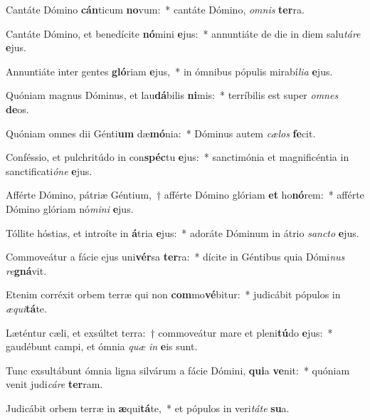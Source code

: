 \item Cantáte Dómino \textbf{cán}ticum \textbf{no}vum:~* cantáte Dómino, \textit{om}\textit{nis} \textbf{ter}ra.
\item Cantáte Dómino, et benedícite \textbf{nó}mini \textbf{e}jus:~* annuntiáte de die in diem salu\textit{tá}\textit{re} \textbf{e}jus.
\item Annuntiáte inter gentes \textbf{gló}riam \textbf{e}jus,~* in ómnibus pópulis mirabí\textit{li}\textit{a} \textbf{e}jus.
\item Quóniam magnus Dóminus, et lau\textbf{dá}bilis \textbf{ni}mis:~* terríbilis est super \textit{om}\textit{nes} \textbf{de}os.
\item Quóniam omnes dii Génti\textbf{um} dæ\textbf{mó}nia:~* Dóminus autem \textit{cæ}\textit{los} \textbf{fe}cit.
\item Conféssio, et pulchritúdo in con\textbf{spéc}tu \textbf{e}jus:~* sanctimónia et magnificéntia in sanctificati\textit{ó}\textit{ne} \textbf{e}jus.
\item Afférte Dómino, pátriæ Géntium,~† afférte Dómino glóriam \textbf{et} ho\textbf{nó}rem:~* afférte Dómino glóriam nó\textit{mi}\textit{ni} \textbf{e}jus.
\item Tóllite hóstias, et introíte in \textbf{á}tria \textbf{e}jus:~* adoráte Dóminum in átrio \textit{sanc}\textit{to} \textbf{e}jus.
\item Commoveátur a fácie ejus uni\textbf{vér}sa \textbf{ter}ra:~* dícite in Géntibus quia Dómi\textit{nus} \textit{re}\textbf{gná}vit.
\item Etenim corréxit orbem terræ qui non \textbf{com}mo\textbf{vé}bitur:~* judicábit pópulos in \textit{æ}\textit{qui}\textbf{tá}te.
\item Læténtur cæli, et exsúltet terra:~† commoveátur mare et pleni\textbf{tú}do \textbf{e}jus:~* gaudébunt campi, et ómnia \textit{quæ} \textit{in} \textbf{e}is sunt.
\item Tunc exsultábunt ómnia ligna silvárum a fácie Dómini, \textbf{qui}a \textbf{ve}nit:~* quóniam venit judi\textit{cá}\textit{re} \textbf{ter}ram.
\item Judicábit orbem terræ in \textbf{æ}qui\textbf{tá}te,~* et pópulos in veri\textit{tá}\textit{te} \textbf{su}a.
